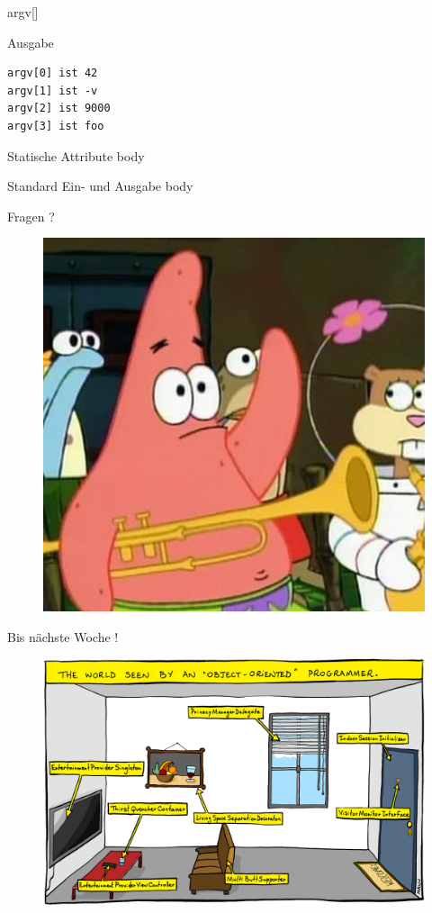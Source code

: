 \documentclass[18pt]{beamer}
\begin{document}
\begin{frame}[fragile]{argv[]}

    \begin{exampleblock}{Ausgabe}
        \begin{lstlisting}
argv[0] ist 42
argv[1] ist -v
argv[2] ist 9000
argv[3] ist foo
        \end{lstlisting}
    \end{exampleblock}

\end{frame}


\begin{frame}{Statische Attribute}
    body
\end{frame}

\begin{frame}{Standard Ein- und Ausgabe}
    body
\end{frame}

\appendix
\beginbackup

\begin{frame}{Fragen ?}
    \begin{figure}
        \includegraphics[scale=0.3]{img/fragen.jpg}
    \end{figure}
\end{frame}

\begin{frame}{Bis nächste Woche !}
    \begin{figure}
        \includegraphics[scale=2]{img/oop.png}
    \end{figure}
\end{frame}

\backupend
\end{document}
